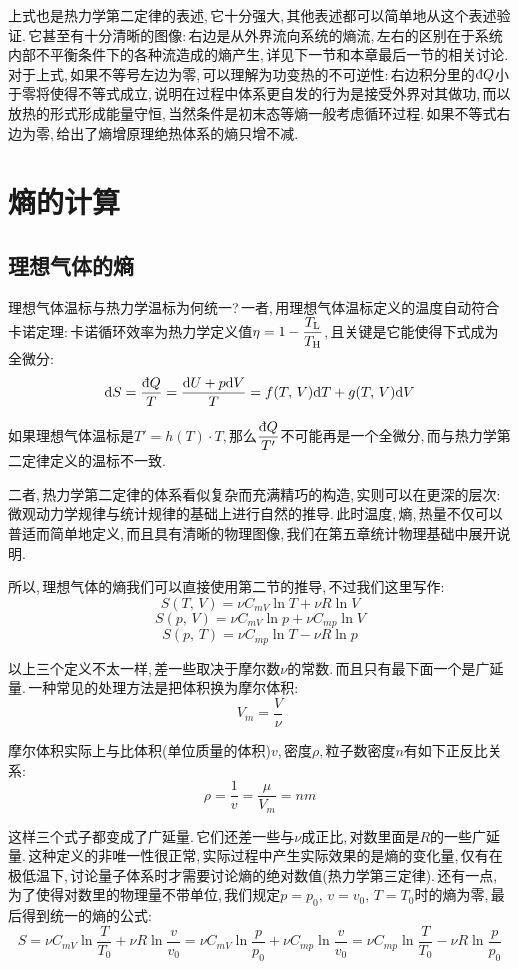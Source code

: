 上式也是热力学第二定律的表述,\,它十分强大,\,其他表述都可以简单地从这个表述验证.\,它甚至有十分清晰的图像:\,右边是从外界流向系统的熵流,\,左右的区别在于系统内部不平衡条件下的各种流造成的熵产生,\,详见下一节和本章最后一节的相关讨论.\,对于上式,\,如果不等号左边为零,\,可以理解为功变热的不可逆性:\,右边积分里的$\dbar Q$小于零将使得不等式成立,\,说明在过程中体系更自发的行为是接受外界对其做功,\,而以放热的形式形成能量守恒,\,当然条件是初末态等熵\ca 一般考虑循环过程.\,如果不等式右边为零,\,给出了熵增原理\ca 绝热体系的熵只增不减.



\vspace{1cm}
\section{熵的计算}

\subsection{理想气体的熵}

理想气体温标与热力学温标为何统一?\,一者,\,用理想气体温标定义的温度自动符合卡诺定理:\,卡诺循环效率为热力学定义值$\displaystyle\eta=1-\frac{T_{\rm L}}{T_{\rm H}}$,\,且关键是它能使得下式成为全微分:
\[\ud S=\frac{\dbar Q}{T}=\frac{\ud U+p\ud V}{T}=f(T,\,V)\ud T+g(T,\,V)\ud V\]

如果理想气体温标是$T'=h(T)\cdot T$,\,那么$\displaystyle \frac{\dbar Q}{T'}$不可能再是一个全微分,\,而与热力学第二定律定义的温标不一致.\,

二者,\,热力学第二定律的体系看似复杂而充满精巧的构造,\,实则可以在更深的层次:\,微观动力学规律与统计规律的基础上进行自然的推导.\,此时温度,\,熵,\,热量不仅可以普适而简单地定义,\,而且具有清晰的物理图像,\,我们在第五章统计物理基础中展开说明.

所以,\,理想气体的熵我们可以直接使用第二节的推导,\,不过我们这里写作:
\[S(T,\,V)=\nu C_{mV}\ln T+\nu R \ln V\]
\[S(p,\,V)=\nu C_{mV}\ln p+\nu C_{mp} \ln V\]
\[S(p,\,T)=\nu C_{mp}\ln T-\nu R \ln p\]

以上三个定义不太一样,\,差一些取决于摩尔数$\nu$的常数.\,而且只有最下面一个是广延量.\,一种常见的处理方法是把体积换为摩尔体积:
\[V_m=\frac{V}{\nu}\]

摩尔体积实际上与比体积(单位质量的体积)$v$,\,密度$\rho$,\,粒子数密度$n$有如下正反比关系:
\[\rho=\frac{1}{v}=\frac{\mu}{V_m}=nm\]

这样三个式子都变成了广延量.\,它们还差一些与$\nu$成正比,\,对数里面是$R$的一些广延量.\,这种定义的非唯一性很正常,\,实际过程中产生实际效果的是熵的变化量,\,仅有在极低温下,\,讨论量子体系时才需要讨论熵的绝对数值(热力学第三定律).\,还有一点,\,为了使得对数里的物理量不带单位,\,我们规定$p=p_0,\,v=v_0,\,T=T_0$时的熵为零,\,最后得到统一的熵的公式:
\[S=\nu C_{mV}\ln \frac{T}{T_0}+\nu R \ln \frac{v}{v_0}=\nu C_{mV}\ln \frac{p}{p_0}+\nu C_{mp} \ln \frac{v}{v_0}=\nu C_{mp}\ln \frac{T}{T_0}-\nu R \ln \frac{p}{p_0}\]

